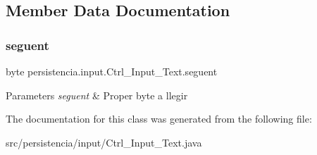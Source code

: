 \subsection{Member Data Documentation}
\mbox{\label{classpersistencia_1_1input_1_1Ctrl__Input__Text_a533e9e0497774114b57d8dd5a6bbb000}} 
\subsubsection{\texorpdfstring{seguent}{seguent}}
{\footnotesize\ttfamily byte persistencia.\+input.\+Ctrl\+\_\+\+Input\+\_\+\+Text.\+seguent\hspace{0.3cm}{\ttfamily [package]}}


\begin{DoxyParams}{Parameters}
{\em seguent} & Proper byte a llegir \\
\hline
\end{DoxyParams}


The documentation for this class was generated from the following file\+:\begin{DoxyCompactItemize}
\item 
src/persistencia/input/Ctrl\+\_\+\+Input\+\_\+\+Text.\+java\end{DoxyCompactItemize}
